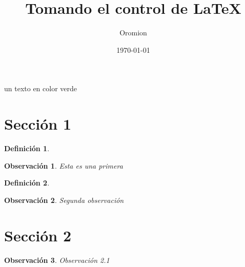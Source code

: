 \documentclass{article}
\title{Tomando el control de \LaTeX}
\author{Oromion}
\date{\today}
\newtheorem{definicion}{Definición}
\newtheorem{obs}{Observación}[section]
\begin{document}
\maketitle

\textcolor{myGreen}{un texto en color verde}

\lipsum[1]

\cuadratica{}

\lipsum[1]

\cuadratica{}

\Fourier[eq]

\section{Sección 1}

\lipsum[1]
\begin{definicion}
\lipsum[1]
\end{definicion}

\begin{obs}
Esta es una primera
\end{obs}

\begin{definicion}
	\lipsum[1]
\end{definicion}


\begin{obs}
Segunda observación

\end{obs}

\section{Sección 2}

\begin{obs}
Observación 2.1
\end{obs}
\end{document}
